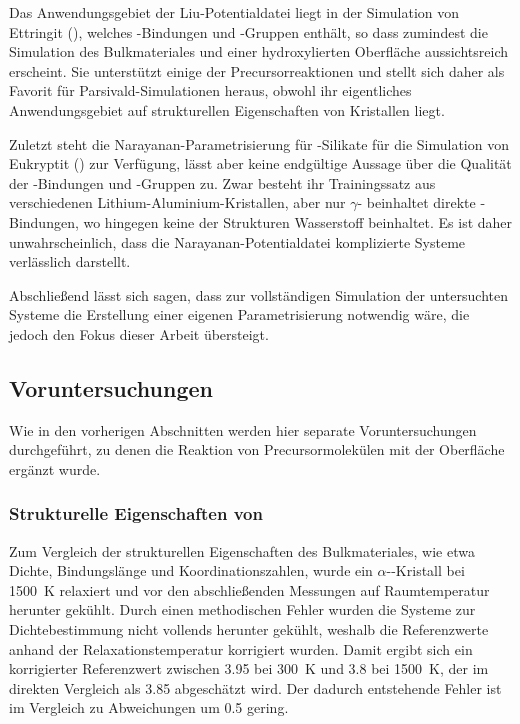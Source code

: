 Das Anwendungsgebiet der Liu-Potentialdatei liegt in der Simulation von Ettringit (), welches -Bindungen und -Gruppen enthält, so dass zumindest die Simulation des Bulkmateriales und einer hydroxylierten Oberfläche aussichtsreich erscheint.
Sie unterstützt einige der Precursorreaktionen und stellt sich daher als Favorit für Parsivald-Simulationen heraus, obwohl ihr eigentliches Anwendungsgebiet auf strukturellen Eigenschaften von Kristallen liegt.

Zuletzt steht die Narayanan-Parametrisierung für -Silikate für die Simulation von Eukryptit () zur Verfügung, lässt aber keine endgültige Aussage über die Qualität der -Bindungen und -Gruppen zu.
Zwar besteht ihr Trainingssatz aus verschiedenen Lithium-Aluminium-Kristallen, aber nur $\gamma$- beinhaltet direkte -Bindungen, wo hingegen keine der Strukturen Wasserstoff beinhaltet.
Es ist daher unwahrscheinlich, dass die Narayanan-Potentialdatei komplizierte Systeme verlässlich darstellt.

Abschließend lässt sich sagen, dass zur vollständigen Simulation der untersuchten Systeme die Erstellung einer eigenen Parametrisierung notwendig wäre, die jedoch den Fokus dieser Arbeit übersteigt.

\subsection{Voruntersuchungen}

Wie in den vorherigen Abschnitten werden hier separate Voruntersuchungen durchgeführt, zu denen die Reaktion von Precursormolekülen mit der Oberfläche ergänzt wurde.

\subsubsection{Strukturelle Eigenschaften von }

Zum Vergleich der strukturellen Eigenschaften des Bulkmateriales, wie etwa Dichte, Bindungslänge und Koordinationszahlen, wurde ein $\alpha$--Kristall bei \SI{1500}{\kelvin} relaxiert und vor den abschließenden Messungen auf Raumtemperatur herunter gekühlt.
Durch einen methodischen Fehler wurden die Systeme zur Dichtebestimmung nicht vollends herunter gekühlt, weshalb die Referenzwerte anhand der Relaxationstemperatur korrigiert wurden.
Damit ergibt sich ein korrigierter Referenzwert zwischen \SI{3.95}{\gpcc} bei \SI{300}{\kelvin} und \SI{3.8}{\gpcc} bei \SI{1500}{\kelvin}\cite{fiquet_high-temperature_1999}, der im direkten Vergleich als \SI{3.85}{\gpcc} abgeschätzt wird.
Der dadurch entstehende Fehler ist im Vergleich zu Abweichungen um \SI{0.5}{\gpcc} gering.

